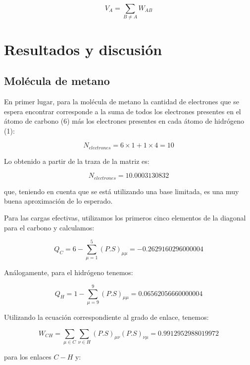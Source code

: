 \documentclass[10pt,a4paper]{article}
\begin{document}
\begin{equation}
V_{A} = \sum_{B \neq A} W_{AB}
\end{equation}

\section{Resultados y discusión}

\subsection*{Molécula de metano}

En primer lugar, para la molécula de metano la cantidad de electrones que se espera encontrar corresponde a la suma de todos los electrones presentes en el átomo de carbono (6) más los electrones presentes en cada átomo de hidrógeno (1):

\begin{equation}
N_{electrones} = 6 \times 1 + 1 \times 4 = 10
\end{equation}

Lo obtenido a partir de la traza de la matriz es:

\begin{equation}
N_{electrones} = 10.0003130832
\end{equation}

que, teniendo en cuenta que se está utilizando una base limitada, es una muy buena aproximación de lo esperado.

Para las cargas efectivas, utilizamos los primeros cinco elementos de la diagonal para el carbono y calculamos:

\begin{equation}
Q_{C} = 6 - \sum_{\mu=1}^{5} (P.S)_{\mu \mu} = -0.2629160296000004
\end{equation}

Análogamente, para el hidrógeno tenemos:

\begin{equation}
Q_{H} = 1 - \sum_{\mu=9}^{9} (P.S)_{\mu \mu} = 0.06562056660000004
\end{equation}

Utilizando la ecuación correspondiente al grado de enlace, tenemos:

\begin{equation}
W_{CH} = \sum_{\mu \in C} \sum_{\nu \in H} (P.S)_{\mu \nu} (P.S)_{\nu \mu} = 0.9912952988019972
\end{equation}

para los enlaces $C-H$ y:
\end{document}

